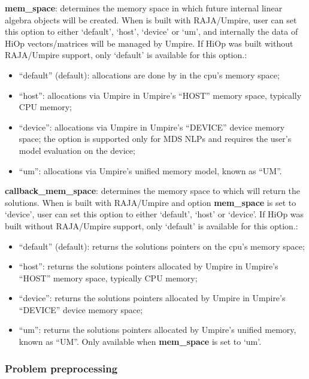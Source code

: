 \noindent \textbf{mem\_space}: determines the memory space in which future internal linear algebra objects will be created. When \Hi is built with RAJA/Umpire, user can set this option to either `default', `host', `device' or `um', and internally the data of HiOp vectors/matrices will be managed by Umpire. If HiOp was built without RAJA/Umpire support, only `default' is available for this option.:
\begin{itemize}
\item ``default'' (default): allocations are done by \Hi in the cpu's memory space;
\item ``host'':  allocations via Umpire in Umpire's ``HOST'' memory space, typically CPU memory;
\item ``device'': allocations via Umpire in Umpire's ``DEVICE'' device memory space; the option is supported only for MDS NLPs and requires the user's model evaluation on the device;
\item ``um'': allocations via Umpire's unified memory model, known as ``UM''.
\end{itemize}
\medskip

\noindent \textbf{callback\_mem\_space}: determines the memory space to which \Hi will return the solutions. When \Hi is built with RAJA/Umpire and option \textbf{mem\_space} is set to `device', user can set this option to either `default', `host' or `device'. If HiOp was built without RAJA/Umpire support, only `default' is available for this option.:
\begin{itemize}
\item ``default'' (default): returns the solutions pointers on the cpu's memory space;
\item ``host'':  returns the solutions pointers allocated by Umpire in Umpire's ``HOST'' memory space, typically CPU memory;
\item ``device'': returns the solutions pointers allocated by Umpire in Umpire's ``DEVICE'' device memory space; 
\item ``um'': returns the solutions pointers allocated by Umpire's unified memory, known as ``UM''. Only available when \textbf{mem\_space} is set to `um'.
\end{itemize}
\medskip



\subsubsection{Problem preprocessing}

